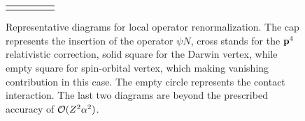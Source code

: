 \begin{frame}
\begin{figure}[!hbtp]
\begin{tabular}{ccccc}
{\begin{tikzpicture}[baseline=($(p1)!0.5!(x)$)]
\begin{feynman}
						\diagram* {
						(p1) -- [fermion] (i);
						(p2) -- [double distance=1pt] (i);
						(i) -- [fermion,quarter left] (y1);
						(y1) -- [fermion, quarter left] (x);
						(i) -- [HQET, quarter right] (z1);
						(z1) -- [HQET,quarter right] (x);
						(y1) -- [scalar] (z1);
						};
					\end{feynman}
				\end{tikzpicture}
			}
	\end{tabular}
	\caption{\label{Fig:vertex:corr:all} Representative diagrams for local operator renormalization. The cap represents the
	insertion of the operator $\psi N$, cross stands for the ${\bf p}^4$ relativistic correction,
	solid square for the Darwin vertex, while empty square for spin-orbital vertex, which making vanishing contribution
	in this case. The empty circle represents the contact interaction.
	The last two diagrams are beyond the prescribed accuracy of ${\cal O}(Z^2\alpha^2)$.}
	\end{figure}

\end{frame}



